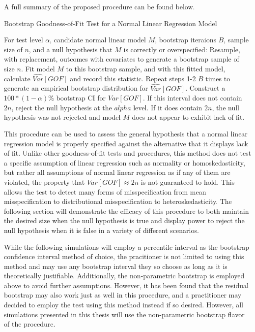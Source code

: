 		A full summary of the proposed procedure can be found below.
		\begin{algorithm}
			\caption{Bootstrap Goodness-of-Fit Test for a Normal Linear Regression Model}
			\begin{algorithmic}[1]
			  \Statex For test level $\alpha$, candidate normal linear model $M$, bootstrap iteraions $B$, sample size of $n$, and a null hypothesis that $M$
			  is correctly or overspecified:
			  \State Resample, with replacement, outcomes with covariates to generate a bootstrap sample of size $n$.
			  \State Fit model $M$ to this bootstrap sample, and with this fitted model, calculate $\widehat{Var}[GOF]$
			  and record this statistic.
			  \State Repeat steps 1-2 $B$ times to generate an empirical bootstrap distribution for $\widehat{Var}[GOF]$.
			  \State Construct a $100*(1-\alpha)$\% bootstrap CI for $Var[GOF]$.
			  \State If this interval does not contain $2n$, reject the null hypothesis at the $alpha$ level. If it does contain
			  $2n$, the null hypothesis was not rejected and model $M$ does not appear to exhibit lack of fit. 
			\end{algorithmic}
		\end{algorithm}

		This procedure can be used to assess the general hypothesis that a normal linear regression model is properly specified against the alternative that it displays lack of fit.
		Unlike other goodness-of-fit tests and procedures, this method does not test a specific assumption of linear regression such as normality or homoskedasticity, but rather
		all assumptions of normal linear regression as if any of them are violated, the property that $Var[GOF] \approx 2n$ is not guaranteed to hold. This allows the test to detect
		many forms of misspecification from mean misspecification to distributional misspecification to heteroskedasticity. The following section will demonstrate the efficacy of
		this procedure to both maintain the desired size when the null hypothesis is true and display power to reject the null hypothesis when it is false in a variety of different
		scenarios.
		
		While the following simulations will employ a percentile interval as the bootstrap confidence interval method of choice, the pracitioner is not limited to using this method
		and may use any bootstrap interval they so choose as long as it is theoretically justifiable. Additionally, the non-parametric bootstrap is employed above to avoid further
		assumptions. However, it has been found that the residual bootstrap may also work just as well in this procedure, and a practitioner may decided to employ the test
		using this method instead if so desired. However, all simulations presented in this thesis will use the non-parametric bootstrap flavor of the procedure.
		
